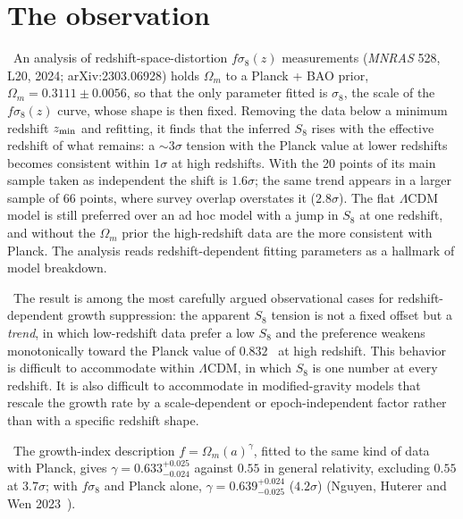 \section{The observation}
\observed\ An analysis of redshift-space-distortion $f\sigma_8(z)$ measurements (\emph{MNRAS} 528, L20, 2024; arXiv:\allowbreak{}2303.06928) holds
$\Omega_m$ to a Planck + BAO prior, $\Omega_m=0.3111\pm0.0056$, so that the only parameter fitted is $\sigma_8$, the scale of the $f\sigma_8(z)$
curve, whose shape is then fixed. Removing the data below a minimum redshift $z_{\rm min}$ and refitting, it finds that the inferred $S_8$ rises with
the effective redshift of what remains: a $\sim3\sigma$ tension with the Planck value at lower redshifts becomes consistent within $1\sigma$ at high
redshifts. With the 20 points of its main sample taken as independent the shift is $1.6\sigma$; the same trend appears in a larger sample of 66
points, where survey overlap overstates it ($2.8\sigma$). The flat $\Lambda$CDM model is still preferred over an ad hoc model with a jump in $S_8$ at
one redshift, and without the $\Omega_m$ prior the high-redshift data are the more consistent with Planck. The analysis reads redshift-dependent
fitting parameters as a hallmark of model breakdown.

\observed\ The result is among the most carefully argued observational cases for redshift-dependent growth suppression: the apparent $S_8$ tension is
not a fixed offset but a \emph{trend}, in which low-redshift data prefer a low $S_8$ and the preference weakens monotonically toward the Planck value
of $0.832$~\cite{Planck2018VI} at high redshift. This behavior is difficult to accommodate within $\Lambda$CDM, in which $S_8$ is one number at every
redshift. It is also difficult to accommodate in modified-gravity models that rescale the growth rate by a scale-dependent or epoch-independent factor
rather than with a specific redshift shape. \interp

\observed\ The growth-index description $f=\Omega_m(a)^\gamma$, fitted to the same kind of data with Planck, gives
$\gamma=0.633^{+0.025}_{-0.024}$ against $0.55$ in general relativity, excluding $0.55$ at $3.7\sigma$; with $f\sigma_8$ and Planck alone,
$\gamma=0.639^{+0.024}_{-0.025}$ ($4.2\sigma$) (Nguyen, Huterer and Wen 2023~\cite{Nguyen2023}).

